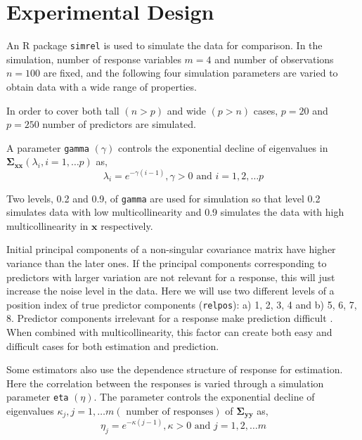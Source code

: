 \documentclass[12pt,3p,authoryear]{elsarticle}
\providecommand{\tightlist}{%
  \setlength{\itemsep}{0pt}\setlength{\parskip}{0pt}}
\begin{document}
\hypertarget{experimental-design}{%
\section{Experimental Design}\label{experimental-design}}

An R \citep{coreR2018} package \texttt{simrel} \citep{Rimal2018, saebo2015simrel} is used to simulate the data for comparison. In the simulation, number of response variables \(m = 4\) and number of observations \(n = 100\) are fixed, and the following four simulation parameters are varied to obtain data with a wide range of properties.

\begin{description}
\tightlist
\item[\textbf{Number of predictors: (\texttt{p})}]
In order to cover both tall \((n>p)\) and wide \((p>n)\) cases, \(p= 20\) and \(p= 250\) number of predictors are simulated.
\item[\textbf{Multicollinearity in predictor variables: (\texttt{gamma})}]
A parameter \texttt{gamma} \((\gamma)\) controls the exponential decline of eigenvalues in \(\boldsymbol{\Sigma_{xx}} (\lambda_i, i = 1, \ldots p)\) as,
\begin{equation}
  \lambda_i = e^{-\gamma(i-1)}, \gamma > 0 \text{ and } i = 1, 2, \ldots p
  \label{eq:gamma}
  \end{equation}

Two levels, 0.2 and 0.9, of \texttt{gamma} are used for simulation so that level 0.2 simulates data with low multicollinearity and 0.9 simulates the data with high multicollinearity in \(\mathbf{x}\) respectively.
\item[\textbf{Position of relevant components: (\texttt{relpos})}]
Initial principal components of a non-singular covariance matrix have higher variance than the later ones. If the principal components corresponding to predictors with larger variation are not relevant for a response, this will just increase the noise level in the data. Here we will use two different levels of a position index of true predictor components (\texttt{relpos}): a) 1, 2, 3, 4 and b) 5, 6, 7, 8. Predictor components irrelevant for a response make prediction difficult \citep{Helland1994b}. When combined with multicollinearity, this factor can create both easy and difficult cases for both estimation and prediction.
\item[\textbf{Correlation in response variables: (\texttt{eta})}]
Some estimators also use the dependence structure of response for estimation. Here the correlation between the responses is varied through a simulation parameter \texttt{eta} \((\eta)\). The parameter controls the exponential decline of eigenvalues \(\kappa_j, j = 1, \ldots m (\text{ number of responses})\) of \(\boldsymbol{\Sigma_{yy}}\) as,
\begin{equation}
\eta_j = e^{-\kappa(j-1)}, \kappa > 0 \text{ and } j = 1, 2, \ldots m
\label{eq:eta}
\end{equation}


\end{description}
\end{document}
